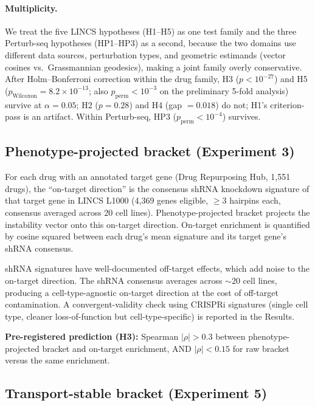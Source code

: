 \documentclass[10pt]{article}
\begin{document}
\paragraph{Multiplicity.}
We treat the five LINCS hypotheses (H1--H5) as one test family and the
three Perturb-seq hypotheses (HP1--HP3) as a second, because the two
domains use different data sources, perturbation types, and geometric
estimands (vector cosines vs.\ Grassmannian geodesics), making a joint
family overly conservative. After Holm--Bonferroni
correction within the drug family, H3 ($p < 10^{-27}$) and H5
($p_{\text{Wilcoxon}} = 8.2 \times 10^{-13}$; also
$p_{\text{perm}} < 10^{-3}$ on the preliminary 5-fold analysis) survive
at $\alpha = 0.05$; H2 ($p = 0.28$) and H4 (gap $= 0.018$) do not;
H1's criterion-pass is an artifact.
Within Perturb-seq, HP3 ($p_{\text{perm}} < 10^{-4}$) survives.

\subsection{Phenotype-projected bracket (Experiment 3)}

For each drug with an annotated target gene (Drug Repurposing Hub,
1{,}551 drugs), the ``on-target direction'' is the consensus shRNA
knockdown signature of that target gene in LINCS L1000 (4{,}369 genes
eligible, $\geq$3 hairpins each, consensus averaged across 20 cell lines).
Phenotype-projected bracket projects the instability vector onto this
on-target direction. On-target enrichment is quantified by cosine squared
between each drug's mean signature and its target gene's shRNA consensus.

shRNA signatures have well-documented off-target effects, which add noise
to the on-target direction. The shRNA consensus averages across
${\sim}20$ cell lines, producing a cell-type-agnostic on-target
direction at the cost of off-target contamination. A convergent-validity
check using CRISPRi signatures (single cell type, cleaner
loss-of-function but cell-type-specific) is reported in the Results.

\textbf{Pre-registered prediction (H3):} Spearman $|\rho| > 0.3$ between
phenotype-projected bracket and on-target enrichment, AND $|\rho| < 0.15$
for raw bracket versus the same enrichment.

\subsection{Transport-stable bracket (Experiment 5)}
\end{document}
